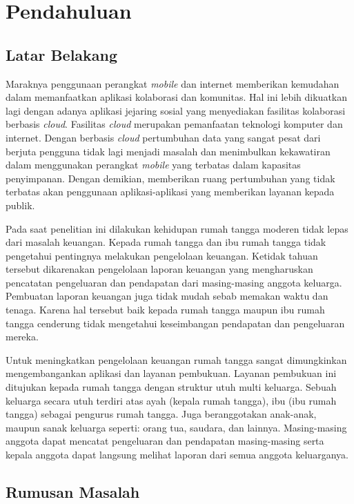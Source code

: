 \chapter{Pendahuluan}
\label{chap:pendahuluan}

\section{Latar Belakang}
\label{sec:latarbelakang}
Maraknya penggunaan perangkat \textit{mobile} dan internet memberikan kemudahan dalam memanfaatkan aplikasi kolaborasi dan komunitas. Hal ini lebih dikuatkan lagi dengan adanya aplikasi jejaring sosial yang menyediakan fasilitas kolaborasi berbasis \textit{cloud}. Fasilitas \textit{cloud} merupakan pemanfaatan teknologi komputer dan internet. Dengan berbasis \textit{cloud} pertumbuhan data yang sangat pesat dari berjuta pengguna tidak lagi menjadi masalah dan menimbulkan kekawatiran dalam menggunakan perangkat \textit{mobile} yang terbatas dalam kapasitas penyimpanan. Dengan demikian, memberikan ruang pertumbuhan yang tidak terbatas akan penggunaan aplikasi-aplikasi yang memberikan layanan kepada publik. 

Pada saat penelitian ini dilakukan kehidupan rumah tangga moderen tidak lepas dari masalah keuangan. Kepada rumah tangga dan ibu rumah tangga tidak pengetahui pentingnya melakukan pengelolaan keuangan. Ketidak tahuan tersebut dikarenakan pengelolaan laporan keuangan yang mengharuskan pencatatan pengeluaran dan pendapatan dari masing-masing anggota keluarga. Pembuatan laporan keuangan juga tidak mudah sebab memakan waktu dan tenaga. Karena hal tersebut baik kepada rumah tangga maupun ibu rumah tangga cenderung tidak mengetahui keseimbangan pendapatan dan pengeluaran mereka.


Untuk meningkatkan pengelolaan keuangan rumah tangga sangat dimungkinkan mengembangankan aplikasi dan layanan pembukuan. Layanan pembukuan ini ditujukan kepada rumah tangga dengan struktur utuh multi keluarga. Sebuah keluarga secara utuh terdiri atas ayah (kepala rumah tangga), ibu (ibu rumah tangga) sebagai pengurus rumah tangga. Juga beranggotakan anak-anak, maupun sanak keluarga seperti: orang tua, saudara, dan lainnya. Masing-masing anggota dapat mencatat pengeluaran dan pendapatan masing-masing serta kepala anggota dapat langsung melihat laporan dari semua anggota keluarganya.

\section{Rumusan Masalah}
\label{sec:rumusanmalasah}

